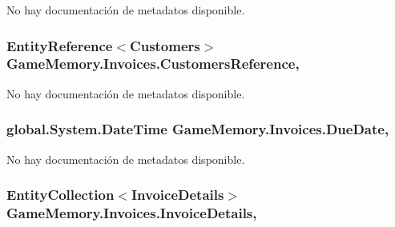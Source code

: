 No hay documentación de metadatos disponible. 

\hypertarget{class_game_memory_1_1_invoices_af845c24d8cd3d0bad861299e693e5b0e}{
\subsubsection[{Customers\-Reference}]{\setlength{\rightskip}{0pt plus 5cm}Entity\-Reference$<${\bf Customers}$>$ Game\-Memory.\-Invoices.\-Customers\-Reference\hspace{0.3cm}{\ttfamily [get]}, {\ttfamily [set]}}}\label{class_game_memory_1_1_invoices_af845c24d8cd3d0bad861299e693e5b0e}


No hay documentación de metadatos disponible. 

\hypertarget{class_game_memory_1_1_invoices_a34f6ae1c319669d255f64b19e6574218}{
\subsubsection[{Due\-Date}]{\setlength{\rightskip}{0pt plus 5cm}global.\-System.\-Date\-Time Game\-Memory.\-Invoices.\-Due\-Date\hspace{0.3cm}{\ttfamily [get]}, {\ttfamily [set]}}}\label{class_game_memory_1_1_invoices_a34f6ae1c319669d255f64b19e6574218}


No hay documentación de metadatos disponible. 

\hypertarget{class_game_memory_1_1_invoices_a5ae6f975426aa0a9f86af85e03e23f10}{
\subsubsection[{Invoice\-Details}]{\setlength{\rightskip}{0pt plus 5cm}Entity\-Collection$<${\bf Invoice\-Details}$>$ Game\-Memory.\-Invoices.\-Invoice\-Details\hspace{0.3cm}{\ttfamily [get]}, {\ttfamily [set]}}}\label{class_game_memory_1_1_invoices_a5ae6f975426aa0a9f86af85e03e23f10}


